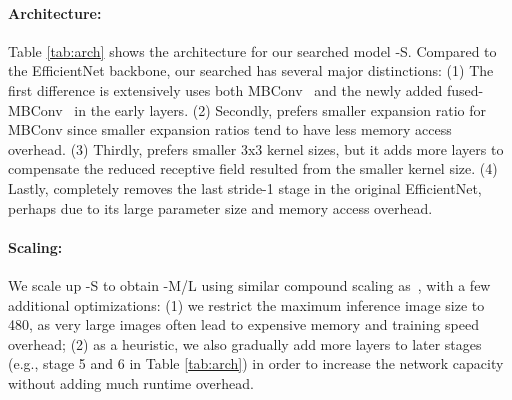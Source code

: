 \documentclass{article}
\begin{document}
\paragraph{{\xnet} Architecture:} Table \ref{tab:arch} shows the architecture for our searched model {\xnet}-S. Compared to the EfficientNet backbone, our searched {\xnet} has several major distinctions: (1) The first difference is {\xnet} extensively uses both MBConv~\cite{mobilenetv218,efficientnet19} and the newly added fused-MBConv~\cite{efficientnetedgetpu19} in the early layers. (2) Secondly, {\xnet} prefers smaller expansion ratio for MBConv since smaller expansion ratios tend to have less memory access overhead. (3) Thirdly, {\xnet} prefers smaller 3x3 kernel sizes, but it adds more layers to compensate the reduced receptive field resulted from the smaller kernel size. (4) Lastly, {\xnet} completely removes the last stride-1 stage in the original EfficientNet, perhaps due to its large parameter size and memory access overhead.

\begin{table}[t]
    \caption{
        {\xnet}-S architecture -- MBConv and Fused-MBConv blocks are described in Figure \ref{fig:fusedmbconv}.
    }
    \centering

\label{tab:arch}                                                    
\end{table} 
\paragraph{{\xnet} Scaling:}
We scale up {\xnet}-S to obtain {\xnet}-M/L using similar compound scaling as~\cite{efficientnet19}, with a few additional optimizations: (1) we restrict the maximum inference image size to 480, as very large images often lead to expensive memory and training speed overhead; (2) as a heuristic, we also gradually add more layers to later stages (e.g., stage 5 and 6 in Table \ref{tab:arch}) in order to increase the network capacity without adding much runtime overhead.
\end{document}
